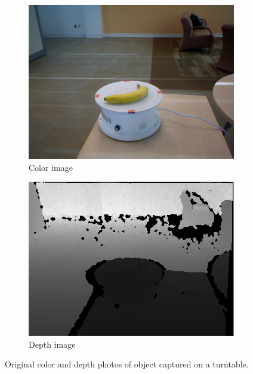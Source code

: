 \begin{figure}
    \centering
    \begin{subfigure}[b]{0.45\linewidth}
    	\includegraphics[width=\textwidth]{img/banana_1_1_1.png}
    	\caption{Color image}
    \end{subfigure}   	
    \begin{subfigure}[b]{0.45\linewidth}
    	\includegraphics[width=\textwidth]{img/banana_1_1_1_depth.png}
    	\caption{Depth image}
    \end{subfigure}
    \caption{Original color and depth photos of object captured on a turntable.}
    \label{fig:orig_img}
\end{figure}

